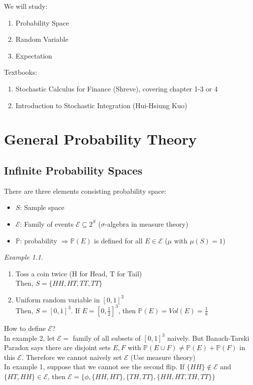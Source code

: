 \documentclass[12pt]{report}
\renewcommand{\1}{\mathbb{1}}
\renewcommand{\subset}{\subseteq}
\newcommand{\RNum}[1]{\uppercase\expandafter{\romannumeral #1\relax}}
\theoremstyle{break}
\theoremstyle{newdef}
\theoremstyle{remark}
\newtheorem*{exmp}{Example} %
\begin{document}
We will study:
\begin{enumerate}
\item Probability Space
\item Random Variable
\item Expectation
\end{enumerate}

Textbooks:
\begin{enumerate}
\item Stochastic Calculus for Finance \RNum{2} (Shreve), covering chapter 1-3 or 4
\item Introduction to Stochastic Integration (Hui-Hsiung Kuo)
\end{enumerate}



\chapter{General Probability Theory}
\section{Infinite Probability Spaces}
There are three elements consisting probability space:
\begin{itemize}
\item $S$: Sample space
\item $\mathcal{E}$: Family of events $\mathcal{E} \subset 2^S$ ($\sigma$-algebra in measure theory)
\item $\mathbb{P}$: probability $\Rightarrow \mathbb{P}(E)$ is defined for all $E \in \mathcal{E}$ ($\mu$ with $\mu(S)=1$)
\end{itemize}

\begin{exmp}
\begin{minipage}[t]{\linegoal}
\begin{enumerate}
\item Toss a coin twice (H for Head, T for Tail)\\
Then, $S = \{HH, HT, TT, TT\}$
\item Uniform random variable in $[0,1]^3$\\
Then, $S = [0,1]^3$.
If $E = [0,\frac{1}{2}]^3$, then $\mathbb{P}(E) = Vol(E) = \frac{1}{8}$\\
\end{enumerate}
\end{minipage}

How to define $\mathcal{E}$?\\
In example 2, let $\mathcal{E} = $ family of all subsets of $[0,1]^3$ naively.
But Banach-Tarski Paradox says there are disjoint sets $E,F$ with $\mathbb{P}(E\cup F) \neq \mathbb{P}(E) + \mathbb{P}(F)$ in this $\mathcal{E}$.
Therefore we cannot naively set $\mathcal{E}$ (Use measure theory)\\

In example 1, suppose that we cannot see the second flip.
If $\{HH\} \not\in \mathcal{E}$ and $\{HT, HH\}\in\mathcal{E}$, then $\mathcal{E} = \{\phi, \{HH,HT\}, \{TH,TT\}, \{HH,HT,TH,TT\}\}$
\end{exmp}
\end{document}
